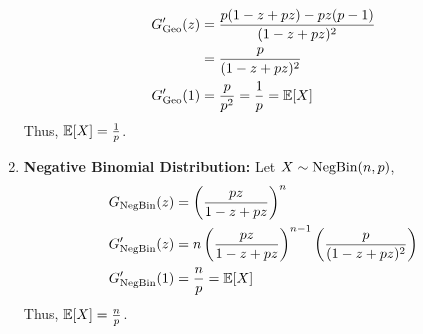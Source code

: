 \begin{solution}
\begin{enumerate}
\begin{align}
			      G'_{\text{Geo}}(z) & = \frac{p(1-z+pz) - pz(p-1)}{(1-z+pz)^2} \\
			                 & = \frac{p}{(1-z+pz)^2}                   \\
			      G'_{\text{Geo}}(1) & = \frac{p}{p^2} = \frac{1}{p} = \mathbb{E}[X]
		      \end{align}
		      Thus, $\mathbb{E}[X] = \frac{1}{p}$.
		\item \textbf{Negative Binomial Distribution:} Let $X\sim\text{NegBin}(n,p)$,
		      \begin{align}
			      G_{\text{NegBin}}(z)  & = \left( \frac{pz}{1-z+pz} \right)^n \\
			      G'_{\text{NegBin}}(z) & = n\left( \frac{pz}{1-z+pz}
			      \right)^{n-1}\left(\frac{p}{(1-z+pz)^2}\right)       \\
			      G'_{\text{NegBin}}(1) & = \frac{n}{p} = \mathbb{E}[X]
		      \end{align}
		      Thus, $\mathbb{E}[X] = \frac{n}{p}$.
	\end{enumerate}

\end{solution}
